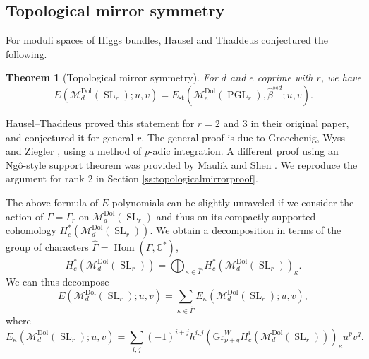 \documentclass[12pt,a4paper]{amsbook}
\newtheorem{thm}{Theorem}[chapter]
\theoremstyle{remark} \newtheorem{rmk}[thm]{Remark}
\theoremstyle{definition} \newtheorem{defn}[thm]{Definition}
\theoremstyle{definition} \newtheorem{ex}[thm]{Example}
\theoremstyle{definition} \newtheorem{ej}{Exercise}
\newcommand{\C}{\mathbb C}
\newcommand{\cM}{\mathcal M}
\newcommand{\Dol}{\mathrm{Dol}}
\DeclareMathOperator{\Hom}{Hom}
\DeclareMathOperator{\SL}{SL}
\DeclareMathOperator{\PGL}{PGL}
\begin{document}
\subsection*{Topological mirror symmetry}
For moduli spaces of Higgs bundles, Hausel and Thaddeus conjectured the following.

\begin{thm}[Topological mirror symmetry]
  For $d$ and $e$ coprime with $r$, we have
  \begin{equation*}
E(\cM_d^{\Dol}(\SL_r); u,v) = E_{\mathrm{st}}(\cM^{\Dol}_e(\PGL_r), \hat{\beta}^{\otimes d}; u,v).
  \end{equation*}
\end{thm}

Hausel--Thaddeus proved this statement for $r=2$ and $3$ in their original paper, and conjectured it for general $r$. The general proof is due to Groechenig, Wyss and Ziegler \cite{GWZ_Mirror}, using a method of $p$-adic integration. A different proof using an Ngô-style support theorem was provided by Maulik and Shen \cite{MaulikShen_Endoscopic}. We reproduce the argument for rank $2$ in Section \ref{ss:topologicalmirrorproof}.

The above formula of $E$-polynomials can be slightly unraveled if we consider the action of $\Gamma=\Gamma_r$ on $\cM_d^\Dol(\SL_r)$ and thus on its compactly-supported cohomology $H_c^*(\cM_d^\Dol(\SL_r))$. We obtain a decomposition in terms of the group of characters $\hat{\Gamma}=\Hom(\Gamma,\C^*)$,
\begin{equation*}
H^*_c(\cM_d^\Dol(\SL_r)) = \bigoplus_{\kappa \in \hat{\Gamma}} H^*_c(\cM_d^\Dol(\SL_r))_\kappa.
\end{equation*}
We can thus decompose
\begin{equation*}
E(\cM_d^\Dol(\SL_r);u,v) = \sum_{\kappa \in \hat{\Gamma}} E_\kappa(\cM_d^\Dol(\SL_r);u,v),
\end{equation*}
where
\begin{equation*}
E_\kappa(\cM_d^\Dol(\SL_r);u,v) = \sum_{i,j} (-1)^{i+j} h^{i,j}(\mathrm{Gr}^W_{p+q} H^i_c(\cM_d^\Dol(\SL_r)))_\kappa u^pv^q.
\end{equation*}
\end{document}

